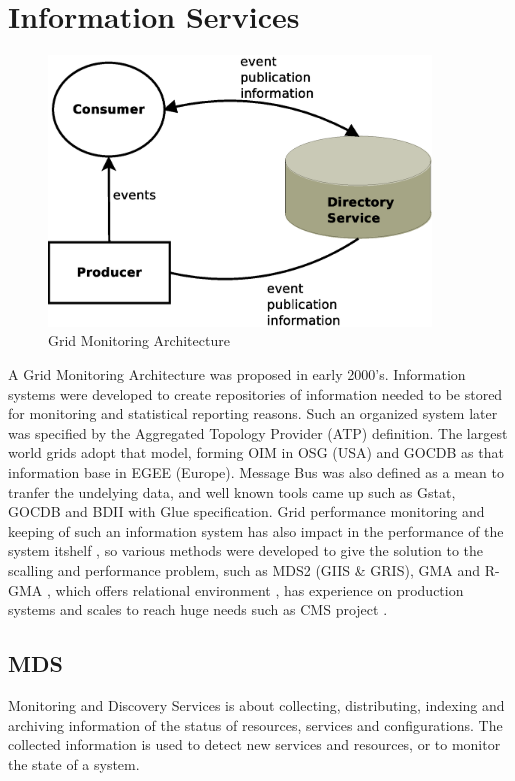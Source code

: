 \section{Information Services}
\begin{figure}[htb]
\centering
 \includegraphics[width=4in]{images/gma.eps}
\caption{Grid Monitoring Architecture}
\label{figure:gma}
\end{figure}
A Grid Monitoring Architecture \cite{tierney2002grid} was proposed in early
2000's. Information systems were developed to create repositories of information
needed to be stored for monitoring and statistical reporting reasons. Such an
organized system later was specified by the Aggregated Topology Provider (ATP)
definition. The largest world grids adopt that model, forming OIM in OSG (USA)
and GOCDB as that information base in EGEE (Europe). Message Bus was also
defined as a mean to tranfer the undelying data, and well known tools came up
such as Gstat, GOCDB and BDII with Glue specification. Grid performance
monitoring and keeping of such an information system has also impact in the
performance of the system itshelf \cite{zhang2003performance}, so various
methods were developed to give the solution to the scalling and performance
problem, such as MDS2 (GIIS \& GRIS), GMA and R-GMA
\cite{wilson2004information}, which offers relational environment
\cite{fisher2001relational}, has experience on production systems 
\cite{byrom-production} and scales to reach huge needs such as CMS project
\cite{Bonacorsi2004,Byrom}.

\subsection{MDS}
Monitoring and Discovery Services is about collecting, distributing, indexing
and archiving information of the status of resources, services and
configurations. The collected information is used to detect new services and
resources, or to monitor the state of a system.

